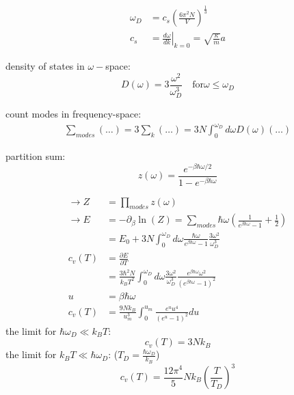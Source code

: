 \begin{equation*}
    \begin{aligned}
        \omega_D &= c_s \left(\frac{6 \pi^2 N}{V}\right)^{\frac{1}{3}} \\
        c_s &= \left. \frac{d\omega}{dk} \right|_{k=0} = \sqrt{\frac{\kappa}{m}}a
    \end{aligned}
\end{equation*}

density of states in $\omega-$space:
\begin{equation*}
    D(\omega) = 3 \frac{\omega^2}{\omega_D^3} \quad \text{for} \omega \leq \omega_D
\end{equation*}

count modes in frequency-space:
\begin{equation*}
    \begin{aligned}
        \sum_{modes} (\dots) = 3 \sum_k (\dots) = 3N \int_0^{\omega_D} d\omega D(\omega) (\dots)
    \end{aligned}
\end{equation*}

partition sum:
\begin{equation*}
    z(\omega) = \frac{e^{-\beta \hbar \omega/2}}{1- e^{-\beta \hbar \omega}}
\end{equation*}

\begin{equation*}
    \begin{aligned}
        \rightarrow Z &= \prod_{modes} z(\omega) \\
        \rightarrow E &= - \partial_\beta \ln(Z) = \sum_{modes} \hbar \omega \left(\frac{1}{e^{\beta \hbar \omega}-1} +\frac{1}{2}\right)\\
            &= E_0 + 3N \int_0^{\omega_D} d\omega \frac{\hbar \omega}{e^{\beta \hbar \omega}-1} \frac{3 \omega^2}{\omega_D^3}\\
        c_v(T) &= \frac{\partial E}{\partial T} \\
            &= \frac{3 \hbar^2 N}{k_B T^2} \int_0^{\omega_D} d\omega \frac{3\omega^2}{\omega_D^3} \frac{e^{\beta \hbar \omega}\omega^2}{\left(e^{\beta \hbar \omega}-1\right)^2} \\
        u &= \beta \hbar \omega \\
        c_v(T) &= \frac{9Nk_B}{u_m^3} \int_0^{u_m} \frac{e^u u^4}{\left(e^u -1\right)^2} du
    \end{aligned}
\end{equation*}
the limit for $\hbar \omega_D \ll k_B T$:
\begin{equation*}
    c_v(T) = 3Nk_B
\end{equation*}
the limit for $k_B T \ll \hbar \omega_D$: ($T_D = \frac{\hbar \omega_D}{k_B}$)
\begin{equation*}
    c_v(T) = \frac{12 \pi^4}{5} N k_B \left(\frac{T}{T_D}\right)^3
\end{equation*}

